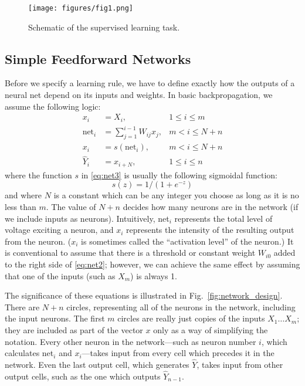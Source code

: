 \documentclass[journal]{IEEEtran} %
\begin{document}
\begin{figure}[htb]
    \centering
    \texttt{[image: figures/fig1.png]} %
    \caption{Schematic of the supervised learning task.}
    \label{fig:supervised_learning}
\end{figure}

\subsection{Simple Feedforward Networks}
Before we specify a learning rule, we have to define exactly how the outputs of a neural net depend on its inputs and weights. In basic backpropagation, we assume the following logic:
\begin{align}
    x_i &= X_i, & 1 \le i \le m \label{eq:net1} \\
    \text{net}_i &= \sum_{j=1}^{i-1} W_{ij} x_j, & m < i \le N+n \label{eq:net2} \\
    x_i &= s(\text{net}_i), & m < i \le N+n \label{eq:net3} \\
    \hat{Y}_i &= x_{i+N}, & 1 \le i \le n \label{eq:net4}
\end{align}
where the function $s$ in \eqref{eq:net3} is usually the following sigmoidal function:
\begin{equation}
    s(z) = 1/(1 + e^{-z}) \label{eq:sigmoid}
\end{equation}
and where $N$ is a constant which can be any integer you choose as long as it is no less than $m$. The value of $N+n$ decides how many neurons are in the network (if we include inputs as neurons). Intuitively, net$_i$ represents the total level of voltage exciting a neuron, and $x_i$ represents the intensity of the resulting output from the neuron. ($x_i$ is sometimes called the ``activation level'' of the neuron.) It is conventional to assume that there is a threshold or constant weight $W_{i0}$ added to the right side of \eqref{eq:net2}; however, we can achieve the same effect by assuming that one of the inputs (such as $X_m$) is always 1.

The significance of these equations is illustrated in Fig.~\ref{fig:network_design}. There are $N+n$ circles, representing all of the neurons in the network, including the input neurons. The first $m$ circles are really just copies of the inputs $X_1 \dots X_m$; they are included as part of the vector $x$ only as a way of simplifying the notation. Every other neuron in the network---such as neuron number $i$, which calculates net$_i$ and $x_i$---takes input from every cell which precedes it in the network. Even the last output cell, which generates $\hat{Y}$, takes input from other output cells, such as the one which outputs $\hat{Y}_{n-1}$.
\end{document}
